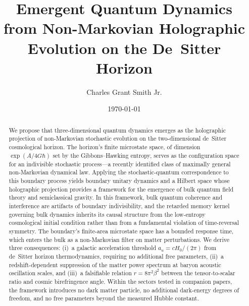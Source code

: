 \documentclass[aps,prd,twocolumn,superscriptaddress,nofootinbib]{revtex4-2}
\begin{document}
\title{Emergent Quantum Dynamics from Non-Markovian Holographic Evolution on the De~Sitter Horizon}

\author{Charles Grant Smith Jr.}

\date{\today}

\begin{abstract}
We propose that three-dimensional quantum dynamics emerges as the holographic projection of non-Markovian stochastic evolution on the two-dimensional de~Sitter cosmological horizon. The horizon's finite microstate space, of dimension $\exp(A/4G\hbar)$ set by the Gibbons--Hawking entropy, serves as the configuration space for an indivisible stochastic process---a recently identified class of maximally general non-Markovian dynamical law. Applying the stochastic-quantum correspondence to this boundary process yields boundary unitary dynamics and a Hilbert space whose holographic projection provides a framework for the emergence of bulk quantum field theory and semiclassical gravity. In this framework, bulk quantum coherence and interference are artifacts of boundary indivisibility, and the retarded memory kernel governing bulk dynamics inherits its causal structure from the low-entropy cosmological initial condition rather than from a fundamental violation of time-reversal symmetry. The boundary's finite-area microstate space has a bounded response time, which enters the bulk as a non-Markovian filter on matter perturbations. We derive three consequences: (i)~a galactic acceleration threshold $a_u = cH_0/(2\pi)$ from de~Sitter horizon thermodynamics, requiring no additional free parameters, (ii)~a redshift-dependent suppression of the matter power spectrum at baryon acoustic oscillation scales, and (iii)~a falsifiable relation $r = 8\pi^2\beta^2$ between the tensor-to-scalar ratio and cosmic birefringence angle. Within the sectors tested in companion papers, the framework introduces no dark matter particle, no additional dark-energy degrees of freedom, and no free parameters beyond the measured Hubble constant.
\end{abstract}

\maketitle

\end{document}
